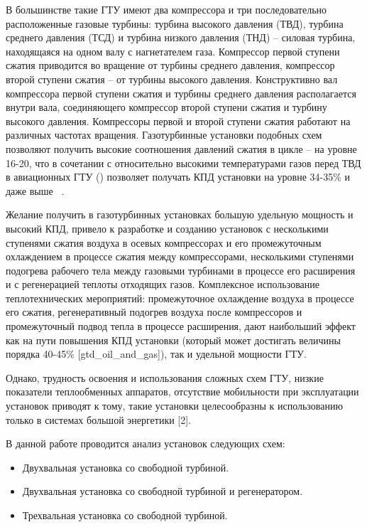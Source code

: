 В большинстве такие ГТУ имеют два компрессора и три последовательно расположенные газовые турбины: турбина высокого
давления (ТВД), турбина среднего давления (ТСД) и турбина низкого давления (ТНД) – силовая турбина, находящаяся на одном
валу с нагнетателем газа. Компрессор первой ступени сжатия приводится во вращение от турбины среднего  давления,
компрессор второй ступени сжатия – от турбины высокого давления. Конструктивно вал компрессора первой ступени сжатия и
турбины среднего давления   располагается внутри вала, соединяющего компрессор второй ступени сжатия и турбину высокого
давления.  Компрессоры первой и второй ступени сжатия  работают на различных частотах вращения. Газотурбинные установки
подобных схем позволяют получить высокие соотношения давлений сжатия в цикле – на уровне 16-20, что в сочетании с относительно
высокими температурами газов перед ТВД в авиационных ГТУ () позволяет получать КПД установки на уровне 34-35\% и даже выше ~\cite{gtd_tomsk}.

Желание получить в газотурбинных установках большую удельную мощность и высокий КПД, привело к разработке и созданию
установок с несколькими ступенями сжатия воздуха в осевых компрессорах и его промежуточным охлаждением в процессе сжатия
между компрессорами, несколькими ступенями подогрева рабочего тела между газовыми турбинами в процессе его расширения и с
регенерацией теплоты отходящих газов. Комплексное использование теплотехнических мероприятий: промежуточное охлаждение воздуха
в процессе его сжатия, регенеративный подогрев воздуха после компрессоров и промежуточный подвод тепла в процессе расширения,
дают наибольший эффект как на пути повышения КПД установки (который может достигать величины порядка 40-45\% [gtd_oil_and_gas]),
так  и удельной мощности ГТУ.

Однако, трудность освоения и использования сложных схем ГТУ,  низкие показатели теплообменных аппаратов,  отсутствие мобильности при эксплуатации установок приводят к тому, такие установки целесообразны к использованию только в системах большой энергетики [2].

В данной работе проводится анализ установок следующих схем:
\begin{itemize}
	\item Двухвальная установка со свободной турбиной.
	\item Двухвальная установка со свободной турбиной и регенератором.
	\item Трехвальная установка со свободной турбиной.
\end{itemize}

